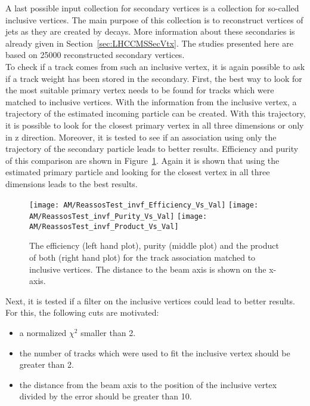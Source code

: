 A last possible input collection for secondary vertices is a collection for so-called inclusive vertices. The main purpose of this collection is to reconstruct vertices of jets as they are created by \PB{} decays. More information about these secondaries is already given in Section~\ref{sec:LHCCMSSecVtx}. The studies presented here are based on 25000 reconstructed secondary vertices. \\
To check if a track comes from such an inclusive vertex, it is again possible to ask if a track weight has been stored in the secondary. First, the best way to look for the most suitable primary vertex needs to be found for tracks which were matched to inclusive vertices. With the information from the inclusive vertex, a trajectory of the estimated incoming particle can be created. With this trajectory, it is possible to look for the closest primary vertex in all three dimensions or only in z direction. Moreover, it is tested to see if an association using only the trajectory of the secondary particle leads to better results. Efficiency and purity of this comparison are shown in Figure~\ref{plot:AMWFSVinvfEffAndPurSO}. Again it is shown that using the estimated primary particle and looking for the closest vertex in all three dimensions leads to the best results. 

\begin{figure}[!ht]
  \centering
  \texttt{[image: AM/ReassosTest\_invf\_Efficiency\_Vs\_Val]}
  \texttt{[image: AM/ReassosTest\_invf\_Purity\_Vs\_Val]}
  \texttt{[image: AM/ReassosTest\_invf\_Product\_Vs\_Val]}
  \caption[Efficiency, purity and their product of the association with inclusive vertices for different search options as a function of distance to the beam axis]{The efficiency (left hand plot), purity (middle plot) and the product of both (right hand plot) for the track association matched to inclusive vertices. The distance to the beam axis is shown on the x-axis.\label{plot:AMWFSVinvfEffAndPurSO}}
\end{figure}

Next, it is tested if a filter on the inclusive vertices could lead to better results. For this, the following cuts are motivated:
\begin{itemize}
\item a normalized $\chi^{2}$ smaller than 2.
\item the number of tracks which were used to fit the inclusive vertex should be greater than 2.
\item the distance from the beam axis to the position of the inclusive vertex divided by the error should be greater than 10.
\end{itemize}

